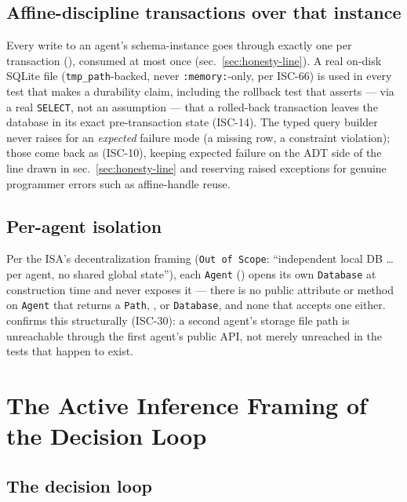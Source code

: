 \documentclass[
  english,
]{article}
\newcounter{none} %
\theoremstyle{definition}
\begin{document}
\subsection{Affine-discipline transactions over that
instance}\label{affine-discipline-transactions-over-that-instance}

Every write to an agent's schema-instance goes through exactly one
 per transaction
(), consumed at most once
(sec.~\ref{sec:honesty-line}). A real on-disk SQLite file
(\texttt{tmp\_path}-backed, never \texttt{:memory:}-only, per ISC-66) is
used in every test that makes a durability claim, including the rollback
test that asserts --- via a real \texttt{SELECT}, not an assumption ---
that a rolled-back transaction leaves the database in its exact
pre-transaction state (ISC-14). The typed query builder never raises for
an \emph{expected} failure mode (a missing row, a constraint violation);
those come back as  (ISC-10),
keeping expected failure on the ADT side of the line drawn in
sec.~\ref{sec:honesty-line} and reserving raised exceptions for genuine
programmer errors such as affine-handle reuse.

\subsection{Per-agent isolation}\label{per-agent-isolation}

Per the ISA's decentralization framing (\texttt{Out\ of\ Scope}:
``independent local DB \ldots{} per agent, no shared global state''),
each \texttt{Agent} () opens
its own \texttt{Database} at construction time and never exposes it ---
there is no public attribute or method on \texttt{Agent} that returns a
\texttt{Path}, , or \texttt{Database}, and
none that accepts one either.
 confirms this
structurally (ISC-30): a second agent's storage file path is unreachable
through the first agent's public API, not merely unreached in the tests
that happen to exist.

\newpage

\section{The Active Inference Framing of the Decision
Loop}\label{sec:active-inference}

\subsection{The decision loop}\label{the-decision-loop}
\end{document}
